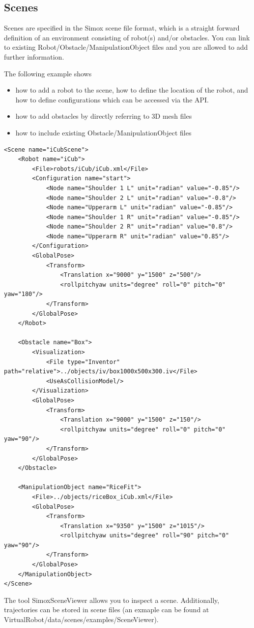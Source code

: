 \subsection{Scenes}
Scenes are specified in the Simox scene file format, which is a straight forward definition of an environment consisting of robot(s) and/or obstacles. You can link to existing Robot/Obstacle/ManipulationObject files and you are allowed to add further information.
\par
The following example shows 
\begin{itemize}
\item how to add a robot to the scene, how to define the location of the robot, and how to define configurations which can be accessed via the API.
\item how to add obstacles by directly referring to 3D mesh files
\item how to include existing Obstacle/ManipulationObject files
\end{itemize}
\begin{lstlisting}
<Scene name="iCubScene">
    <Robot name="iCub">
        <File>robots/iCub/iCub.xml</File>
        <Configuration name="start">
            <Node name="Shoulder 1 L" unit="radian" value="-0.85"/>
            <Node name="Shoulder 2 L" unit="radian" value="-0.8"/>
            <Node name="Upperarm L" unit="radian" value="-0.85"/>
            <Node name="Shoulder 1 R" unit="radian" value="-0.85"/>
            <Node name="Shoulder 2 R" unit="radian" value="0.8"/>
            <Node name="Upperarm R" unit="radian" value="0.85"/>
        </Configuration>
        <GlobalPose>
            <Transform>
                <Translation x="9000" y="1500" z="500"/>
                <rollpitchyaw units="degree" roll="0" pitch="0" yaw="180"/>
            </Transform>
        </GlobalPose>
    </Robot>

    <Obstacle name="Box">
        <Visualization>
            <File type="Inventor" path="relative">../objects/iv/box1000x500x300.iv</File>
            <UseAsCollisionModel/>
        </Visualization>
        <GlobalPose>
            <Transform>
                <Translation x="9000" y="1500" z="150"/>
                <rollpitchyaw units="degree" roll="0" pitch="0" yaw="90"/>
            </Transform>
        </GlobalPose>
    </Obstacle>

    <ManipulationObject name="RiceFit">
        <File>../objects/riceBox_iCub.xml</File>
        <GlobalPose>
            <Transform>
                <Translation x="9350" y="1500" z="1015"/>
                <rollpitchyaw units="degree" roll="90" pitch="0" yaw="90"/>
            </Transform>
        </GlobalPose>
    </ManipulationObject>
</Scene>
\end{lstlisting}
The tool SimoxSceneViewer allows you to inspect a scene. Additionally, trajectories can be stored in scene files (an exmaple can be found at VirtualRobot/data/scenes/examples/SceneViewer).
